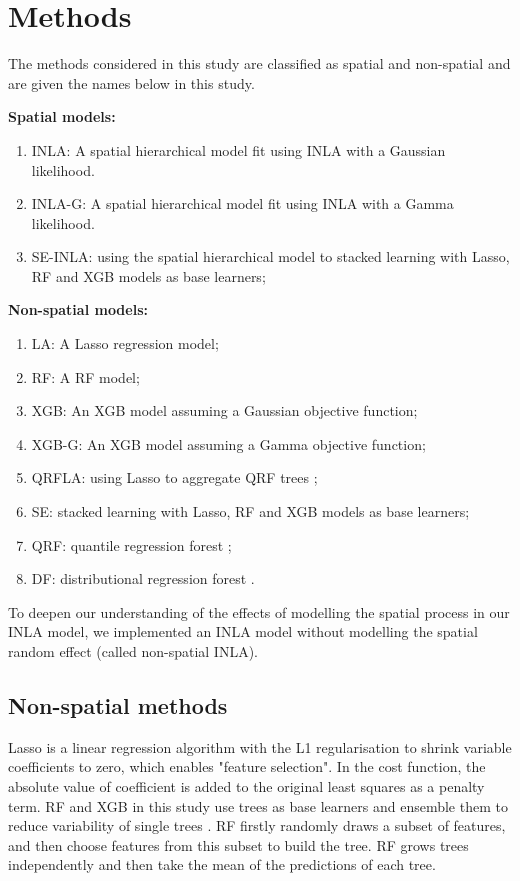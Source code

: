\documentclass{article}
\begin{document}
\section {Methods}

The methods considered in this study are classified as spatial and non-spatial and are given the names below in this study. 

\noindent\textbf{Spatial models:}
\begin{enumerate}
\item INLA: A spatial hierarchical model fit using INLA with a Gaussian likelihood.  
\item INLA-G: A spatial hierarchical model fit using INLA with a Gamma likelihood. 
\item SE-INLA: using the spatial hierarchical model to stacked learning with Lasso, RF and XGB models as base learners;
\end{enumerate}

\noindent\textbf{Non-spatial models:}
\begin{enumerate}
\item LA: A Lasso regression model; 
\item RF: A RF model; 
\item XGB: An XGB model assuming a Gaussian objective function; 
\item XGB-G: An XGB model assuming a Gamma objective function; 
\item QRFLA: using Lasso to aggregate QRF trees \citep{hastie2009elements};
\item SE: stacked learning with Lasso, RF and XGB models as base learners; 
\item QRF: quantile regression forest \citep{meinshausen2006quantile};
\item DF: distributional regression forest \citep{schlosser2019distributional}.
\end{enumerate}

To deepen our understanding of the effects of modelling the spatial process in our INLA model, we implemented an INLA model without modelling the spatial random effect (called non-spatial INLA). 

\noindent\subsection{Non-spatial methods}
Lasso is a linear regression algorithm with the L1 regularisation to shrink variable coefficients to zero, which enables "feature selection". In the cost function, the absolute value of coefficient is added to the original least squares as a penalty term. RF and XGB in this study use trees as base learners and ensemble them to reduce variability of single trees \citep{friedman2001greedy}. RF firstly randomly draws a subset of features, and then choose features from this subset to build the tree. RF \citep{breiman2001random} grows trees independently and then take the mean of the predictions of each tree. 
\end{document}

